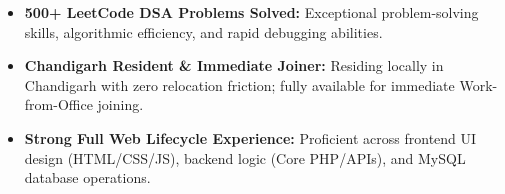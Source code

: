 \documentclass[a4paper,10pt]{article}
\begin{document}
\begin{itemize}

    \item \textbf{500+ LeetCode DSA Problems Solved:} Exceptional problem-solving skills, algorithmic efficiency, and rapid debugging abilities.

    \item \textbf{Chandigarh Resident \& Immediate Joiner:} Residing locally in Chandigarh with zero relocation friction; fully available for immediate Work-from-Office joining.

    \item \textbf{Strong Full Web Lifecycle Experience:} Proficient across frontend UI design (HTML/CSS/JS), backend logic (Core PHP/APIs), and MySQL database operations.

\end{itemize}

\end{document}

